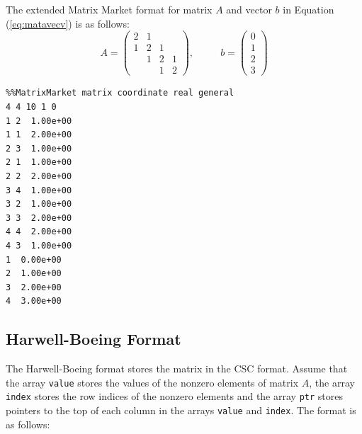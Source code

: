 \documentclass[a4paper]{article}
\begin{document}
The extended Matrix Market format for matrix $A$ and vector $b$ in Equation (\ref{eq:matavecv}) is as follows: 
\begin{equation}
A = 
\left(
\begin{array}{cccc}
2 & 1 &   &    \\
1 & 2 & 1 &    \\ 
  & 1 & 2 & 1 \\
  &   & 1 & 2 
\end{array}
\right), 
~~~~~~~~~~~~
b = 
\left(
\begin{array}{c}
0 \\
1 \\ 
2 \\
3  
\end{array}
\right)
\label{eq:matavecv}
\end{equation}

{\small
\begin{verbatim}
%%MatrixMarket matrix coordinate real general
4 4 10 1 0
1 2  1.00e+00
1 1  2.00e+00
2 3  1.00e+00
2 1  1.00e+00
2 2  2.00e+00
3 4  1.00e+00
3 2  1.00e+00
3 3  2.00e+00
4 4  2.00e+00
4 3  1.00e+00
1  0.00e+00
2  1.00e+00
3  2.00e+00
4  3.00e+00
\end{verbatim}
}

\subsection{Harwell-Boeing Format}
The Harwell-Boeing format stores the matrix in the CSC format.
Assume that the array {\tt value} stores the values of the nonzero elements of matrix $A$, 
the array {\tt index} stores the row indices of the nonzero elements and 
the array {\tt ptr} stores pointers to the top of each column in the
arrays {\tt value} and {\tt index}. The format is as follows: 
\end{document}
